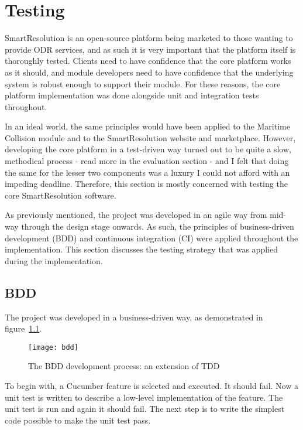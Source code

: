 \chapter{Testing} 

SmartResolution is an open-source platform being marketed to those wanting to provide ODR services, and as such it is very important that the platform itself is thoroughly tested. Clients need to have confidence that the core platform works as it should, and module developers need to have confidence that the underlying system is robust enough to support their module. For these reasons, the core platform implementation was done alongside unit and integration tests throughout.

In an ideal world, the same principles would have been applied to the Maritime Collision module and to the SmartResolution website and marketplace. However, developing the core platform in a test-driven way turned out to be quite a slow, methodical process - read more in the evaluation section - and I felt that doing the same for the lesser two components was a luxury I could not afford with an impeding deadline. Therefore, this section is mostly concerned with testing the core SmartResolution software.

As previously mentioned, the project was developed in an agile way from mid-way through the design stage onwards. As such, the principles of business-driven development (BDD) and continuous integration (CI) were applied throughout the implementation. This section discusses the testing strategy that was applied during the implementation.

\section{BDD}

The project was developed in a business-driven way, as demonstrated in figure~\ref{uml:bdd}.

\begin{figure}[h!]
  \centering
    \ifimages
    \texttt{[image: bdd]}
    \fi
  \caption{The BDD development process: an extension of TDD}
  \label{uml:bdd}
\end{figure}

To begin with, a Cucumber feature is selected and executed. It should fail. Now a unit test is written to describe a low-level implementation of the feature. The unit test is run and again it should fail. The next step is to write the simplest code possible to make the unit test pass.

